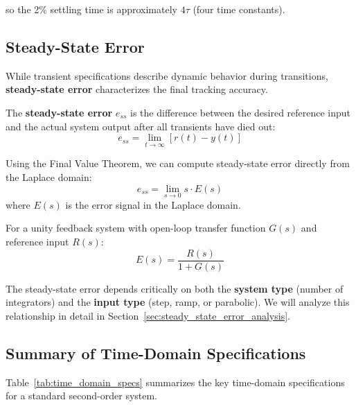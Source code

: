 so the 2\% settling time is approximately $4\tau$ (four time constants).


\subsection{Steady-State Error}
\label{subsec:steady_state_error}

While transient specifications describe dynamic behavior during transitions, \textbf{steady-state error} characterizes the final tracking accuracy.

\begin{definition}
The \textbf{steady-state error} $e_{ss}$ is the difference between the desired reference input and the actual system output after all transients have died out:
\begin{equation}
    e_{ss} = \lim_{t \to \infty} [r(t) - y(t)]
\end{equation}
\end{definition}

Using the Final Value Theorem, we can compute steady-state error directly from the Laplace domain:
\begin{equation}
    e_{ss} = \lim_{s \to 0} s \cdot E(s)
\end{equation}
where $E(s)$ is the error signal in the Laplace domain.

For a unity feedback system with open-loop transfer function $G(s)$ and reference input $R(s)$:
\begin{equation}
    E(s) = \frac{R(s)}{1 + G(s)}
\end{equation}

The steady-state error depends critically on both the \textbf{system type} (number of integrators) and the \textbf{input type} (step, ramp, or parabolic). We will analyze this relationship in detail in Section~\ref{sec:steady_state_error_analysis}.

\subsection{Summary of Time-Domain Specifications}

Table~\ref{tab:time_domain_specs} summarizes the key time-domain specifications for a standard second-order system.

